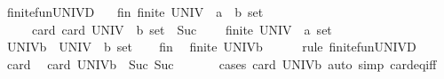 \begin{isabellebody}
\ finite{\isacharunderscore}{\kern0pt}fun{\isacharunderscore}{\kern0pt}UNIVD{}{\isacharcolon}{\kern0pt}\isanewline
\ \ \ fin{\isacharcolon}{\kern0pt}\ {\isachardoublequoteopen}finite\ {\isacharparenleft}{\kern0pt}UNIV\ {\isacharcolon}{\kern0pt}{\isacharcolon}{\kern0pt}\ {\isacharparenleft}{\kern0pt}{\isacharprime}{\kern0pt}a\ {\isasymRightarrow}\ {\isacharprime}{\kern0pt}b{\isacharparenright}{\kern0pt}\ set{\isacharparenright}{\kern0pt}{\isachardoublequoteclose}\isanewline
\ \ \ \ \ card{\isacharcolon}{\kern0pt}\ {\isachardoublequoteopen}card\ {\isacharparenleft}{\kern0pt}UNIV\ {\isacharcolon}{\kern0pt}{\isacharcolon}{\kern0pt}\ {\isacharprime}{\kern0pt}b\ set{\isacharparenright}{\kern0pt}\ {\isasymnoteq}\ Suc\ {}{\isachardoublequoteclose}\isanewline
\ \ \ {\isachardoublequoteopen}finite\ {\isacharparenleft}{\kern0pt}UNIV\ {\isacharcolon}{\kern0pt}{\isacharcolon}{\kern0pt}\ {\isacharprime}{\kern0pt}a\ set{\isacharparenright}{\kern0pt}{\isachardoublequoteclose}\isanewline
%
\isadelimproof
%
\endisadelimproof
%
\isatagproof
{}\isamarkupfalse%
\ {\isacharminus}{\kern0pt}\isanewline
\ \ \isamarkupfalse%
\ {\isacharquery}{\kern0pt}UNIV{\isacharunderscore}{\kern0pt}b\ {\isacharequal}{\kern0pt}\ {\isachardoublequoteopen}UNIV\ {\isacharcolon}{\kern0pt}{\isacharcolon}{\kern0pt}\ {\isacharprime}{\kern0pt}b\ set{\isachardoublequoteclose}\isanewline
\ \ \isamarkupfalse%
\ fin\ \isamarkupfalse%
\ {\isachardoublequoteopen}finite\ {\isacharquery}{\kern0pt}UNIV{\isacharunderscore}{\kern0pt}b{\isachardoublequoteclose}\isanewline
\ \ \ \ \isamarkupfalse%
\ {\isacharparenleft}{\kern0pt}rule\ finite{\isacharunderscore}{\kern0pt}fun{\isacharunderscore}{\kern0pt}UNIVD{}{\isacharparenright}{\kern0pt}\isanewline
\ \ \isamarkupfalse%
\ card\ \isamarkupfalse%
\ {\isachardoublequoteopen}card\ {\isacharquery}{\kern0pt}UNIV{\isacharunderscore}{\kern0pt}b\ {\isasymge}\ Suc\ {\isacharparenleft}{\kern0pt}Suc\ {}{\isacharparenright}{\kern0pt}{\isachardoublequoteclose}\isanewline
\ \ \ \ \isamarkupfalse%
\ {\isacharparenleft}{\kern0pt}cases\ {\isachardoublequoteopen}card\ {\isacharquery}{\kern0pt}UNIV{\isacharunderscore}{\kern0pt}b{\isachardoublequoteclose}{\isacharparenright}{\kern0pt}\ {\isacharparenleft}{\kern0pt}auto\ simp{\isacharcolon}{\kern0pt}\ card{\isacharunderscore}{\kern0pt}eq{\isacharunderscore}{\kern0pt}{}{\isacharunderscore}{\kern0pt}iff{\isacharparenright}{\kern0pt}\isanewline

\end{isabellebody}

